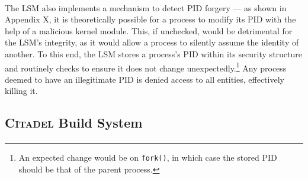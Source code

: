 \paragraph{} The LSM also implements a mechanism to detect PID forgery --- as shown in Appendix X, it is theoretically possible for a process to modify its PID with the help of a malicious kernel module. This, if unchecked, would be detrimental for the LSM's integrity, as it would allow a process to silently assume the identity of another. To this end, the LSM stores a process's PID within its security structure and routinely checks to ensure it does not change unexpectedly.\footnote{An expected change would be on \texttt{fork()}, in which case the stored PID should be that of the parent process.} Any process deemed to have an illegitimate PID is denied access to all entities, effectively killing it.

\subsection{\textsc{Citadel} Build System}
\label{sec:build-system}
\paragraph{}
